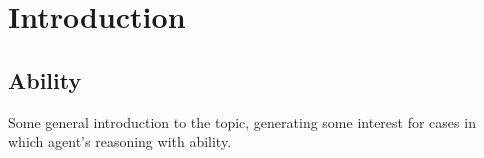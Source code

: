
\chapter{Introduction}
\label{cha:introduction}

\section{Ability}
\label{sec:ability-broad-intro}

\begin{note}
  \color{red}
  Some general introduction to the topic, generating some interest for cases in which agent's reasoning with ability.
\end{note}

